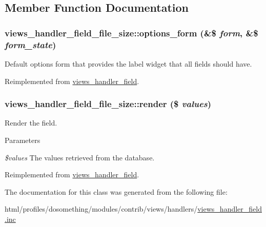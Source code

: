\subsection{Member Function Documentation}
\hypertarget{classviews__handler__field__file__size_ab701c7b97e6688971ddfdcd7e9539262}{
\subsubsection[{options\_\-form}]{\setlength{\rightskip}{0pt plus 5cm}views\_\-handler\_\-field\_\-file\_\-size::options\_\-form (\&\$ {\em form}, \/  \&\$ {\em form\_\-state})}}
\label{classviews__handler__field__file__size_ab701c7b97e6688971ddfdcd7e9539262}
Default options form that provides the label widget that all fields should have. 

Reimplemented from \hyperlink{classviews__handler__field_a0435d161922b7b4b84f02a2e79bb947a}{views\_\-handler\_\-field}.\hypertarget{classviews__handler__field__file__size_a9ceb28e958ee939634f1c91e28b8579c}{
\subsubsection[{render}]{\setlength{\rightskip}{0pt plus 5cm}views\_\-handler\_\-field\_\-file\_\-size::render (\$ {\em values})}}
\label{classviews__handler__field__file__size_a9ceb28e958ee939634f1c91e28b8579c}
Render the field.


\begin{DoxyParams}{Parameters}
\item[{\em \$values}]The values retrieved from the database. \end{DoxyParams}


Reimplemented from \hyperlink{classviews__handler__field_a82ff951c5e9ceb97b2eab86f880cbc1e}{views\_\-handler\_\-field}.

The documentation for this class was generated from the following file:\begin{DoxyCompactItemize}
\item 
html/profiles/dosomething/modules/contrib/views/handlers/\hyperlink{views__handler__field_8inc}{views\_\-handler\_\-field.inc}\end{DoxyCompactItemize}
